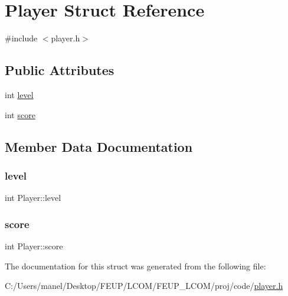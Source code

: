 \hypertarget{struct_player}{}\section{Player Struct Reference}
\label{struct_player}


{\ttfamily \#include $<$player.\+h$>$}

\subsection*{Public Attributes}
\begin{DoxyCompactItemize}
\item 
int \mbox{\hyperlink{struct_player_aa1e06c89dea6981223879e6bfccdb5cd}{level}}
\item 
int \mbox{\hyperlink{struct_player_ace6abae8d66534ad0a1fd6458f786a6e}{score}}
\end{DoxyCompactItemize}


\subsection{Member Data Documentation}
\mbox{\label{struct_player_aa1e06c89dea6981223879e6bfccdb5cd}} 
\subsubsection{\texorpdfstring{level}{level}}
{\footnotesize\ttfamily int Player\+::level}

\mbox{\label{struct_player_ace6abae8d66534ad0a1fd6458f786a6e}} 
\subsubsection{\texorpdfstring{score}{score}}
{\footnotesize\ttfamily int Player\+::score}



The documentation for this struct was generated from the following file\+:\begin{DoxyCompactItemize}
\item 
C\+:/\+Users/manel/\+Desktop/\+F\+E\+U\+P/\+L\+C\+O\+M/\+F\+E\+U\+P\+\_\+\+L\+C\+O\+M/proj/code/\mbox{\hyperlink{player_8h}{player.\+h}}\end{DoxyCompactItemize}
